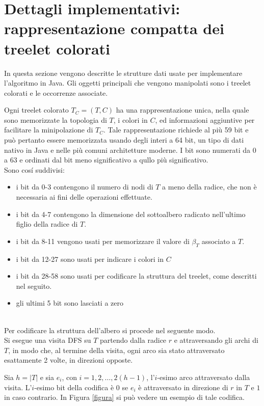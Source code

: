 \section{Dettagli implementativi: rappresentazione compatta dei treelet colorati}
\label{section 2}
In questa sezione vengono descritte le strutture dati usate per implementare l'algoritmo in Java.
Gli oggetti principali che vengono manipolati sono i treelet colorati e le occorrenze associate.

Ogni treelet colorato $ T_C = (T,C) $ ha una rappresentazione unica, nella quale sono memorizzate la topologia di $ T $, i colori in $ C $, ed informazioni aggiuntive per facilitare la minipolazione di $T_C$.
Tale rappresentazione richiede al pi\`u 59 bit e pu\`o pertanto essere memorizzata usando degli interi a 64 bit, un tipo di dati nativo in Java e nelle pi\`u comuni architetture moderne.
I bit sono numerati da 0 a 63 e ordinati dal bit meno significativo a qullo pi\`u significativo.\\
Sono cos\'i suddivisi:
\begin{itemize}
	\item i bit da 0-3 contengono il numero di nodi di $ T $ a meno della radice, che non \`e necessaria ai fini delle operazioni effettuate.
	\item i bit da 4-7 contengono la dimensione del sottoalbero radicato nell'ultimo figlio della radice di $ T $.
	\item i bit da 8-11 vengono usati per memorizzare il valore di $ \beta_T $ associato a $ T $.
	\item i bit da 12-27 sono usati per indicare i colori in $ C $
	\item i bit da 28-58 sono usati per codificare la struttura del treelet, come descritti nel seguito.
	\item gli ultimi 5 bit sono lasciati a zero
\end{itemize}\mbox{}\\

Per codificare la struttura dell'albero si procede nel seguente modo.\\
Si esegue una visita DFS su $ T $ partendo dalla radice $ r $ e attraversando gli archi di $ T $, in modo che, al termine della visita, ogni arco sia stato attraversato esattamente 2 volte, in direzioni opposte. 

Sia $h=|T|$ e sia $e_i$, con $i = 1, 2, \dots, 2(h-1)$, l'$i$-esimo arco attraversato dalla visita. 
L'$i$-esimo bit della codifica \`e $0$ se $e_i$ \`e attraversato in direzione di $r$ in $T$ e $1$ in caso contrario. In Figura \ref{figura} si pu\`o vedere un esempio di tale codifica.

